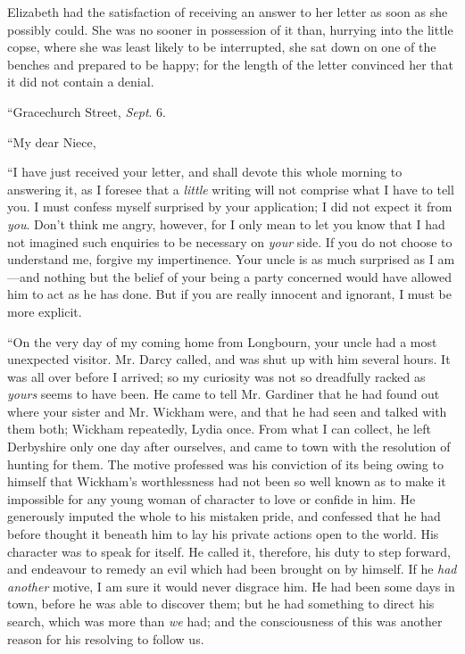 Elizabeth had the satisfaction of receiving an answer to her letter as soon as she possibly could. She was no sooner in possession of it than, hurrying into the little copse, where she was least likely to be interrupted, she sat down on one of the benches and prepared to be happy; for the length of the letter convinced her that it did not contain a denial.

“Gracechurch Street, {\em Sept}. 6.

“My dear Niece,

“I have just received your letter, and shall devote this whole morning to answering it, as I foresee that a {\em little} writing will not comprise what I have to tell you. I must confess myself surprised by your application; I did not expect it from {\em you}. Don't think me angry, however, for I only mean to let you know that I had not imagined such enquiries to be necessary on {\em your} side. If you do not choose to understand me, forgive my impertinence. Your uncle is as much surprised as I am---and nothing but the belief of your being a party concerned would have allowed him to act as he has done. But if you are really innocent and ignorant, I must be more explicit.

“On the very day of my coming home from Longbourn, your uncle had a most unexpected visitor. Mr. Darcy called, and was shut up with him several hours. It was all over before I arrived; so my curiosity was not so dreadfully racked as {\em yours} seems to have been. He came to tell Mr. Gardiner that he had found out where your sister and Mr. Wickham were, and that he had seen and talked with them both; Wickham repeatedly, Lydia once. From what I can collect, he left Derbyshire only one day after ourselves, and came to town with the resolution of hunting for them. The motive professed was his conviction of its being owing to himself that Wickham's worthlessness had not been so well known as to make it impossible for any young woman of character to love or confide in him. He generously imputed the whole to his mistaken pride, and confessed that he had before thought it beneath him to lay his private actions open to the world. His character was to speak for itself. He called it, therefore, his duty to step forward, and endeavour to remedy an evil which had been brought on by himself. If he {\em had another} motive, I am sure it would never disgrace him. He had been some days in town, before he was able to discover them; but he had something to direct his search, which was more than {\em we} had; and the consciousness of this was another reason for his resolving to follow us.


